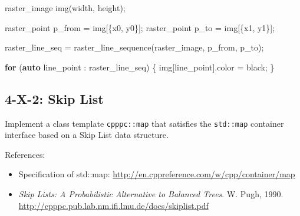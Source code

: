 \documentclass[]{article}
\newenvironment{Shaded}{}{}
\newcommand{\KeywordTok}[1]{\textcolor[rgb]{0.00,0.44,0.13}{\textbf{{#1}}}}
\newcommand{\NormalTok}[1]{{#1}}
\providecommand{\tightlist}{%
  \setlength{\itemsep}{0pt}\setlength{\parskip}{0pt}}
\begin{document}
\begin{Shaded}
\begin{Highlighting}[]
\NormalTok{raster_image img(width, height);}

\NormalTok{raster_point p_from = img[\{x0, y0\}];}
\NormalTok{raster_point p_to   = img[\{x1, y1\}];}

\NormalTok{raster_line_seq = raster_line_sequence(raster_image, p_from, p_to);}

\KeywordTok{for} \NormalTok{(}\KeywordTok{auto} \NormalTok{line_point : raster_line_seq) \{}
  \NormalTok{img[line_point].color = black;}
\NormalTok{\}}
\end{Highlighting}
\end{Shaded}

\subsection{4-X-2: Skip List}\label{x-2-skip-list}

Implement a class template \texttt{cpppc::map} that satisfies the
\texttt{std::map} container interface based on a Skip List data
structure.

References:

\begin{itemize}
\tightlist
\item
  Specification of std::map:
  \url{http://en.cppreference.com/w/cpp/container/map}
\item
  \emph{Skip Lists: A Probabilistic Alternative to Balanced Trees}. W.
  Pugh, 1990. \url{http://cpppc.pub.lab.nm.ifi.lmu.de/docs/skiplist.pdf}
\end{itemize}
\end{document}
